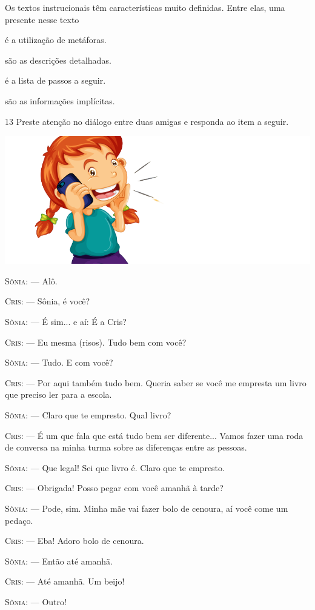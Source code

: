 Os textos instrucionais têm características muito definidas. Entre elas,
uma presente nesse texto

\begin{escolha}
\item é a utilização de metáforas.

\item são as descrições detalhadas.

\item é a lista de passos a seguir.

\item são as informações implícitas.
\end{escolha}

\num{13} Preste atenção no diálogo entre duas amigas e responda ao item a seguir.

\begin{myquote}

\begin{center}
\includegraphics[width=.8\textwidth]{./media/image24f.png}
\end{center}

\textsc{Sônia}: --- Alô.

\textsc{Cris}: --- Sônia, é você?

\textsc{Sônia}: --- É sim... e aí: É a Cris?

\textsc{Cris}: --- Eu mesma (risos). Tudo bem com você?

\textsc{Sônia}: --- Tudo. E com você?

\textsc{Cris}: --- Por aqui também tudo bem. Queria saber se você me empresta um
livro que preciso ler para a escola.

\textsc{Sônia}: --- Claro que te empresto. Qual livro?

\textsc{Cris}: --- É um que fala que está tudo bem ser diferente... Vamos fazer uma
roda de conversa na minha turma sobre as diferenças entre as pessoas.

\textsc{Sônia}: --- Que legal! Sei que livro é. Claro que te empresto.

\textsc{Cris}: --- Obrigada! Posso pegar com você amanhã à tarde?

\textsc{Sônia}: --- Pode, sim. Minha mãe vai fazer bolo de cenoura, aí você come um
pedaço.

\textsc{Cris}: --- Eba! Adoro bolo de cenoura.

\textsc{Sônia}: --- Então até amanhã.

\textsc{Cris}: --- Até amanhã. Um beijo!

\textsc{Sônia}: --- Outro!

\end{myquote}

